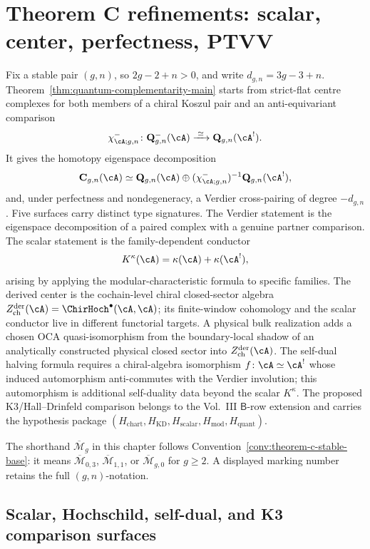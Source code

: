\chapter{Theorem C refinements: scalar, center, perfectness, PTVV}
\label{ch:theorem-C-refinements-platonic}

Fix a stable pair \((g,n)\), so \(2g-2+n>0\), and write
\(d_{g,n}=3g-3+n\).  Theorem~\ref{thm:quantum-complementarity-main}
starts from strict-flat centre complexes for both members of a chiral
Koszul pair and an anti-equivariant comparison
\[
 \chi^-_{\cA;g,n}\colon
 \mathbf Q^-_{g,n}(\cA)\xrightarrow{\;\simeq\;}
 \mathbf Q_{g,n}(\cA^!).
\]
It gives the homotopy eigenspace decomposition
\[
 \mathbf C_{g,n}(\cA)\simeq
 \mathbf Q_{g,n}(\cA)\oplus
 (\chi^-_{\cA;g,n})^{-1}\mathbf Q_{g,n}(\cA^!),
\]
and, under perfectness and nondegeneracy, a Verdier cross-pairing of
degree \(-d_{g,n}\).  Five surfaces carry distinct type signatures.
The Verdier statement is the eigenspace decomposition of a paired
complex with a genuine partner comparison. The scalar statement is the family-dependent
conductor
\[
K^\kappa(\cA)=\kappa(\cA)+\kappa(\cA^!),
\]
arising by applying the modular-characteristic formula to specific
families. The derived center is the cochain-level chiral
closed-sector algebra
$Z^{\mathrm{der}}_{\mathrm{ch}}(\cA)=\ChirHoch^\bullet(\cA,\cA)$;
its finite-window cohomology and the scalar conductor live in
different functorial targets. A physical bulk realization adds a
chosen OCA quasi-isomorphism from the boundary-local shadow of an
analytically constructed physical closed sector into
$Z^{\mathrm{der}}_{\mathrm{ch}}(\cA)$. The self-dual
halving formula
requires a chiral-algebra isomorphism $f\colon\cA\simeq\cA^!$ whose
induced automorphism anti-commutes with the Verdier involution; this
automorphism is additional self-duality data beyond the scalar
$K^\kappa$. The proposed K3/Hall--Drinfeld comparison belongs to the
Vol.~III $\mathsf B$-row extension and carries the hypothesis package
$(H_{\mathrm{chart}},H_{\mathrm{KD}},H_{\mathrm{scalar}},
H_{\mathrm{mod}},H_{\mathrm{quant}})$.

The shorthand \(\overline{\mathcal M}_g\) in this chapter follows
Convention~\ref{conv:theorem-c-stable-base}: it means
\(\overline{\mathcal M}_{0,3}\),
\(\overline{\mathcal M}_{1,1}\), or
\(\overline{\mathcal M}_{g,0}\) for \(g\geq2\).  A displayed
marking number retains the full \((g,n)\)-notation.

\section{Scalar, Hochschild, self-dual, and K3 comparison surfaces}
\label{sec:theorem-C-surface-separation}

